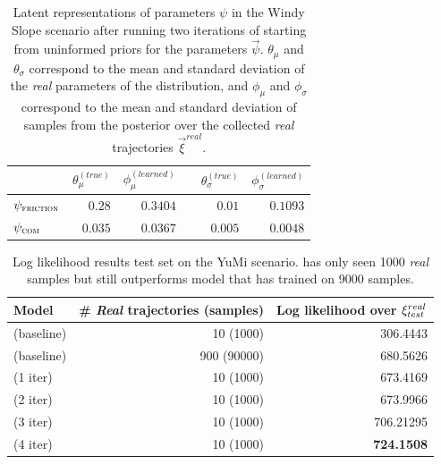 \begin{table}
\centering
\begin{tabular}{lrrcrr}
\toprule
& $\theta_\mu^{(true)}$ & $\phi_\mu^{(learned)}$ && $\theta_\sigma^{(true)}$ & $\phi_\sigma^{(learned)}$ \\
\midrule
$\psi_{\textsc{friction}}$ & $0.28$ & $0.3404$ && $0.01$ & $0.1093$ \\
$\psi_{\textsc{com}}$ & $0.035$ & $ 0.0367$ && $0.005$ & $0.0048$ \\
\bottomrule
\end{tabular}
\caption{Latent representations of parameters $\psi$ in the Windy Slope scenario after running two iterations of \dettostoc{} starting from uninformed priors for the parameters $\vec{\psi}$. $\theta_\mu$ and $\theta_\sigma$ correspond to the mean and standard deviation of the \emph{real} parameters of the distribution, and $\phi_\mu$ and $\phi_\sigma$ correspond to the mean and standard deviation of samples from the posterior over the collected \emph{real} trajectories $\vec{\xi}^{real}$.}
\label{fig_3_parameters_table}
\end{table}


\begin{table}
\centering
\begin{tabular}{lrr}
\toprule
Model & \# \emph{Real} trajectories (samples) & Log likelihood over $\xi^{real}_{test}$ \\
\midrule
\cvae{} (baseline) & 10 (1000) & 306.4443\\
\cvae{} (baseline) & 900 (90000) & 680.5626 \\
\dettostoc{} (1 iter) & 10 (1000) & 673.4169\\
\dettostoc{} (2 iter) & 10 (1000) & 673.9966\\
\dettostoc{} (3 iter) & 10 (1000) & 706.21295\\
\dettostoc{} (4 iter) & 10 (1000) & \textbf{724.1508}\\

\bottomrule
\end{tabular}
\caption{Log likelihood results test set on the YuMi scenario. \dettostoc{} has only seen 1000 \emph{real} samples but still outperforms model that has trained on 9000 samples.}
\label{fig:windyslope_logprob}
\end{table}


